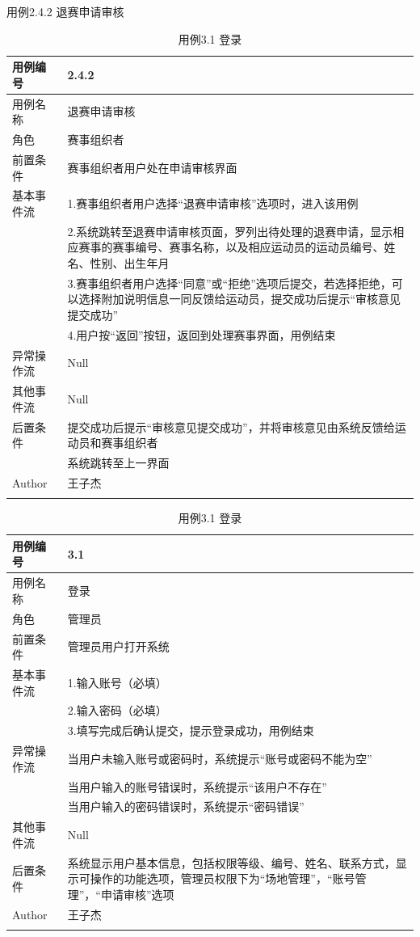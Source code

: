 \documentclass[a4paper,UTF8]{article}
\begin{document}
\begin{table}[H]
	\begin{center}
		\caption{用例2.4.2 退赛申请审核}
		\label{table:Tab_uc242}
		\begin{tabular}{|p{}|p{}|}
			\hline\noalign{\smallskip}
			用例编号 & 2.4.2\\
			\hline
			用例名称 &  退赛申请审核\\
			\hline
			角色 & 赛事组织者\\
			\hline
			前置条件 & 赛事组织者用户处在申请审核界面 \\
			\hline
			基本事件流 & 1.赛事组织者用户选择“退赛申请审核”选项时，进入该用例 \\& 2.系统跳转至退赛申请审核页面，罗列出待处理的退赛申请，显示相应赛事的赛事编号、赛事名称，以及相应运动员的运动员编号、姓名、性别、出生年月 \\& 3.赛事组织者用户选择“同意”或“拒绝”选项后提交，若选择拒绝，可以选择附加说明信息一同反馈给运动员，提交成功后提示“审核意见提交成功” \\& 4.用户按“返回”按钮，返回到处理赛事界面，用例结束\\
			\hline
			异常操作流 & Null \\
			\hline
			其他事件流 & Null \\
			\hline
			后置条件 & 提交成功后提示“审核意见提交成功”，并将审核意见由系统反馈给运动员和赛事组织者\\& 系统跳转至上一界面 \\
			\hline
			Author & 王子杰 \\
			\noalign{\smallskip}
			\hline
			\noalign{\smallskip}
		\end{tabular}
		\caption{用例3.1 登录}
		\label{table:Tab_uc31}
		\begin{tabular}{|p{}|p{}|}
			\hline\noalign{\smallskip}
			用例编号 & 3.1\\
			\hline
			用例名称 &  登录\\
			\hline
			角色 & 管理员\\
			\hline
			前置条件 & 管理员用户打开系统\\
			\hline
			基本事件流 & 1.输入账号（必填）\\& 2.输入密码（必填） \\& 3.填写完成后确认提交，提示登录成功，用例结束\\
			\hline
			异常操作流 & 当用户未输入账号或密码时，系统提示“账号或密码不能为空” \\& 当用户输入的账号错误时，系统提示“该用户不存在” \\& 当用户输入的密码错误时，系统提示“密码错误”\\
			\hline
			其他事件流 & Null\\
			\hline
			后置条件 & 系统显示用户基本信息，包括权限等级、编号、姓名、联系方式，显示可操作的功能选项，管理员权限下为“场地管理”，“账号管理”，“申请审核”选项\\
			\hline
			Author & 王子杰 \\
			\noalign{\smallskip}
			\hline
			\noalign{\smallskip}
		\end{tabular}
	\end{center}
\end{table}
\end{document}
